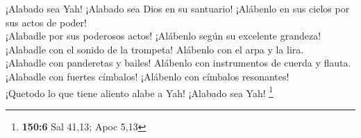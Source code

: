  ¡Alabado sea Yah! ¡Alabado sea Dios en su santuario!
¡Alábenlo en sus cielos por sus actos de poder!\\
 ¡Alabadle por sus poderosos actos! ¡Alábenlo según su
excelente grandeza!\\
 ¡Alabadle con el sonido de la trompeta! Alábenlo con el
arpa y la lira.\\
 ¡Alabadle con panderetas y bailes! Alábenlo con
instrumentos de cuerda y flauta.\\
 ¡Alabadle con fuertes címbalos! ¡Alábenlo con címbalos
resonantes!\\
 ¡Quetodo lo que tiene aliento alabe a Yah! ¡Alabado sea
Yah! \footnote{\textbf{150:6} Sal 41,13; Apoc 5,13}
